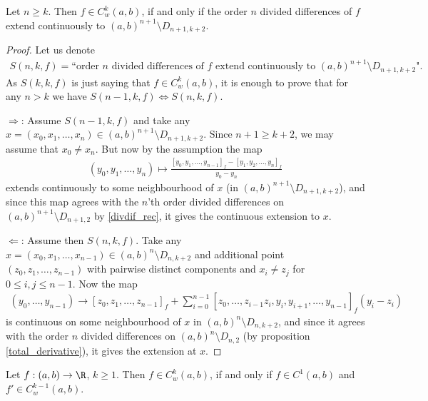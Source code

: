 \begin{lem}\label{weaklyCk_basic}
	Let $n \geq k$. Then $f \in C_{w}^{k}(a, b)$, if and only if the order $n$ divided differences of $f$ extend continuously to $(a, b)^{n + 1} \setminus D_{n + 1, k + 2}$.
\end{lem}
\begin{proof}
	Let us denote
	\begin{align*}
		S(n, k, f) = \text{``order $n$ divided differences of $f$ extend continuously to $(a, b)^{n + 1} \setminus D_{n + 1, k + 2}$"}.
	\end{align*}
	As $S(k, k, f)$ is just saying that $f \in C_{w}^{k}(a, b)$, it is enough to prove that for any $n > k$ we have $S(n - 1, k, f) \Leftrightarrow S(n, k, f)$.

	$\Rightarrow$: Assume $S(n - 1, k, f)$ and take any $x = (x_{0}, x_{1}, \ldots, x_{n}) \in (a, b)^{n + 1} \setminus D_{n + 1, k + 2}$. Since $n + 1 \geq k + 2$, we may assume that $x_{0} \neq x_{n}$. But now by the assumption the map
	\begin{align*}
		(y_{0}, y_{1}, \ldots, y_{n}) \mapsto \frac{[y_{0}, y_{1}, \ldots, y_{n - 1}]_{f} - [y_{1}, y_{2}, \ldots, y_{n}]_{f}}{y_{0} - y_{n}}
	\end{align*}
	extends continuously to some neighbourhood of $x$ (in $(a, b)^{n + 1} \setminus D_{n + 1, k + 2}$), and since this map agrees with the $n$'th order divided differences on $(a, b)^{n + 1} \setminus D_{n + 1, 2}$ by \ref{divdif_rec}, it gives the continuous extension to $x$.

	$\Leftarrow$: Assume then $S(n, k, f)$. Take any $x = (x_{0}, x_{1}, \ldots, x_{n - 1}) \in (a, b)^{n} \setminus D_{n, k + 2}$ and additional point $(z_{0}, z_{1}, \ldots, z_{n - 1})$ with pairwise distinct components and $x_{i} \neq z_{j}$ for $0 \leq i, j \leq n - 1$. Now the map
	\begin{align*}
		(y_{0}, \ldots, y_{n - 1}) \to [z_{0}, z_{1}, \ldots, z_{n - 1}]_{f} + \sum_{i = 0}^{n - 1}[z_{0}, \ldots, z_{i - 1} z_{i}, y_{i}, y_{i + 1}, \ldots, y_{n - 1}]_{f} (y_{i} - z_{i})
	\end{align*}
	is continuous on some neighbourhood of $x$ in $(a, b)^{n} \setminus D_{n, k + 2}$, and since it agrees with the order $n$ divided differences on $(a, b)^{n} \setminus D_{n, 2}$ (by proposition \ref{total_derivative}), it gives the extension at $x$.
\end{proof}

\begin{lem}\label{weaktoreal_lemma}
	Let $f : (a, b) \to \R$, $k \geq 1$. Then $f \in C_{w}^{k}(a, b)$, if and only if $f \in C^{1}(a, b)$ and $f' \in C_{w}^{k - 1}(a, b)$.
\end{lem}


